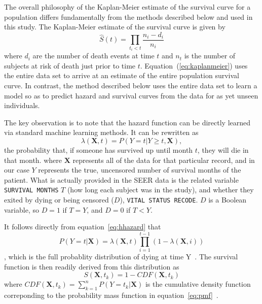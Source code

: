 \documentclass[10pt,letterpaper]{article}
\newcommand{\codewhite}[1]{\colorbox{white}{\texttt{#1}}}
\begin{document}
The overall philosophy of the Kaplan-Meier estimate of the survival curve for a population differs fundamentally from the methods described below and used in this study. 
The Kaplan-Meier estimate of the survival curve is given by
\begin{equation}
\label{eq:kaplanmeier}
\hat{S}(t) = \prod_{t_i < t} \frac{n_i - d_i}{n_i}
\end{equation}
where $d_i$ are the number of death events at time $t$ and $n_t$ is the number of subjects at risk of death just prior to time $t$. 
Equation~(\ref{eq:kaplanmeier}) uses the entire data set to arrive at an estimate of the entire population survival curve. In contrast, the method described below uses the entire data set to learn a model so as to predict hazard and survival curves from the data for as yet unseen individuals.


The key observation is to note that the hazard function can be directly learned via standard machine learning methods. It can be rewritten as
\begin{equation}
\label{eq:hhazard}
\lambda(\mathbf{X}, t) = P(Y = t|Y \geq t, \mathbf{X}),
\end{equation}
the probability that, if someone has survived up until month $t$, they will die in that month.
where $\mathbf{X}$ represents all of the data for that particular record, and in our case $Y$ represents the true, uncensored number of survival months of the patient.
What is actually provided in the SEER data is the related variable \codewhite{SURVIVAL MONTHS} $T$ (how long each subject was in the study), and whether they exited by dying or being censored ($D$), \codewhite{VITAL STATUS RECODE}. 
$D$ is a Boolean variable, so $D = 1$ if $T = Y$, and $D = 0$ if $T < Y$.



It follows directly from equation~\ref{eq:hhazard} that 
\begin{equation}
\label{eq:pmf}
P(Y = t | \mathbf{X}) = \lambda(\mathbf{X}, t) \prod_{i=1}^{t-1} (1 - \lambda(\mathbf{X}, i))
\end{equation},
which is the full probablity distribution of dying at time Y~\cite{kuhn}.
The survival function is then readily derived from this distribution as
\begin{equation}
\label{eq:cdf}
S(\mathbf{X},t_{k}) = 1 - CDF(\mathbf{X}, t_{k})
\end{equation}
where $CDF(\mathbf{X}, t_{k}) = \sum_
{k=1}^{n} P(Y = t_{k} | \mathbf{X}) $ is the cumulative density function correponding to the probability mass function in equation~\ref{eq:pmf}~\cite{downey}.
\end{document}
